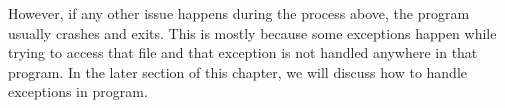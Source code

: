 \documentclass[../main.tex]{subfiles}
\begin{document}
However, if any other issue happens during the process above, the program usually
crashes and exits. This is mostly because some exceptions happen while trying to
access that file and that exception is not handled anywhere in that program. In
the later section of this chapter, we will discuss how to handle exceptions in
program.
\end{document}
